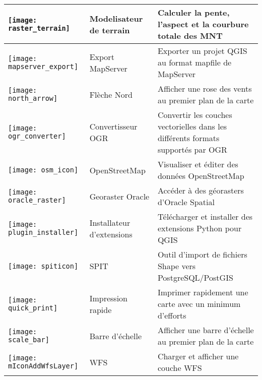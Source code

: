 \begin{minipage}{\textwidth}
\begin{table}[H]
\begin{tabular}{|l|l|p{4in}|}
\hline
\texttt{[image: raster\_terrain]}
& Modelisateur de terrain \index{plugins!Raster Terrain Modelling} & Calculer la pente, l'aspect et la courbure totale des MNT\\
\hline
\texttt{[image: mapserver\_export]}
& Export MapServer \index{plugins!MapServer Export} & Exporter un projet QGIS au format mapfile de MapServer\\
\hline
\texttt{[image: north\_arrow]}
& Flèche Nord \index{plugins!north arrow} & Afficher une rose des vents au premier plan de la carte\\
\hline
\texttt{[image: ogr\_converter]}
 & Convertisseur OGR \index{plugins!OGR converter} & Convertir les couches vectorielles dans les différents formats supportés par OGR\\
\hline
\texttt{[image: osm\_icon]}
 & OpenStreetMap & Visualiser et éditer des données OpenStreetMap\\
\hline
\texttt{[image: oracle\_raster]}
 & Georaster Oracle \index{plugins!georaster} & Accéder à des géorasters d'Oracle Spatial\\
\hline
\texttt{[image: plugin\_installer]}
 & Installateur d'extensions \index{plugins!Plugin Installer} & Télécharger et installer des extensions Python pour QGIS\\
\hline
\texttt{[image: spiticon]}
 & SPIT \index{plugins!spit} & Outil d'import de fichiers Shape vers PostgreSQL/PostGIS\\
\hline
\texttt{[image: quick\_print]}
 & Impression rapide \index{plugins!quick print} & Imprimer rapidement une carte avec un minimum d'efforts\\
\hline
\texttt{[image: scale\_bar]}
 & Barre d'échelle \index{plugins!scalebar} & Afficher une barre d'échelle au premier plan de la carte\\
\hline
\texttt{[image: mIconAddWfsLayer]}
 & WFS & Charger et afficher une couche WFS\\
\hline
\end{tabular}
\end{table}
\end{minipage}

\normalsize
